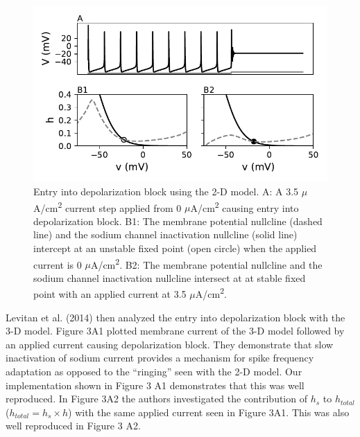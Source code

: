 \begin{figure}
	\centering
	\includegraphics[scale=0.7]{../figures/figure_2.pdf}
	\caption{Entry into depolarization block using the 2-D model. A: A 3.5 $\mu$A/cm\textsuperscript{2} current step applied from 0 $\mu$A/cm\textsuperscript{2} causing entry into depolarization block. B1: The membrane potential nullcline (dashed line) and the sodium channel inactivation nullcline (solid line) intercept at an unstable fixed point (open circle) when the applied current is 0 $\mu$A/cm\textsuperscript{2}. B2: The membrane potential nullcline and the sodium channel inactivation nullcline intersect at at stable fixed point with an applied current at 3.5 $\mu$A/cm\textsuperscript{2}.}
	\label{fig:2}
\end{figure}

Levitan et al. (2014) then analyzed the entry into depolarization block with the 3-D model. Figure 3A1 plotted membrane current of the 3-D model followed by an applied current causing depolarization block. They demonstrate that slow inactivation of sodium current provides a mechanism for spike frequency adaptation as opposed to the “ringing” seen with the 2-D model. Our implementation shown in Figure 3 A1 demonstrates that this was well reproduced. In Figure 3A2 the authors investigated the contribution of $h_s$ to $h_{total}$ ($h_{total}= h_{s} \times h$) with the same applied current seen in Figure 3A1. This was also well reproduced in Figure 3 A2. \\

